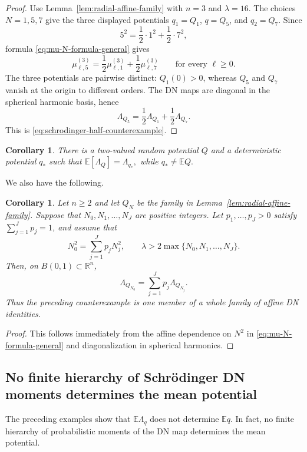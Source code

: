 \documentclass[11pt]{article}
\newcommand{\R}{\mathbb R}
\newcommand{\E}{\mathbb E}
\theoremstyle{plain}
\newtheorem{corollary}[theorem]{Corollary}
\theoremstyle{definition}
\theoremstyle{remark}
\begin{document}
\begin{proof}
Use Lemma~\ref{lem:radial-affine-family} with $n=3$ and $\lambda=16$.  The choices $N=1,5,7$ give the three displayed potentials $q_1=Q_1$, $q=Q_5$, and $q_2=Q_7$.  Since
\[
  5^2=\frac12\cdot1^2+\frac12\cdot7^2,
\]
formula \eqref{eq:mu-N-formula-general} gives
\[
  \mu_{\ell,5}^{(3)}=\frac12\mu_{\ell,1}^{(3)}+\frac12\mu_{\ell,7}^{(3)}
  \qquad\text{for every }\ell\ge0.
\]
The three potentials are pairwise distinct: $Q_1(0)>0$, whereas $Q_5$ and $Q_7$ vanish at the origin to different orders.  The DN maps are diagonal in the spherical harmonic basis, hence
\[
  \Lambda_{Q_5}=\frac12\Lambda_{Q_1}+\frac12\Lambda_{Q_7}.
\]
This is \eqref{eq:schrodinger-half-counterexample}.
\end{proof}

\begin{corollary}\label{cor:random-potential-mean-DN-deterministic}
There is a two-valued random potential $Q$ and a deterministic potential $q_*$ such that
$
  \E[\Lambda_Q]=\Lambda_{q_*},
$
while
$
  q_*\ne \E Q.
$
\end{corollary}

We also have the following.

\begin{corollary}\label{cor:barycentric-DN-identities}
Let $n\ge2$ and let $Q_N$ be the family in Lemma~\ref{lem:radial-affine-family}.  Suppose that $N_0,N_1,\dots,N_J$ are positive integers.  Let $p_1,\dots,p_J>0$ satisfy $\sum_{j=1}^Jp_j=1$, and assume that
\[
  N_0^2=\sum_{j=1}^Jp_jN_j^2,
  \qquad
  \lambda>2\max\{N_0,N_1,\dots,N_J\}.
\]
Then, on $B(0,1)\subset\R^n$,
\[
  \Lambda_{Q_{N_0}}=\sum_{j=1}^Jp_j\Lambda_{Q_{N_j}}.
\]
Thus the preceding counterexample is one member of a whole family of affine DN identities.
\end{corollary}

\begin{proof}
This follows immediately from the affine dependence on $N^2$ in \eqref{eq:mu-N-formula-general} and diagonalization in spherical harmonics.
\end{proof}

\subsection{No finite hierarchy of Schr\"odinger DN moments determines the mean potential}
\label{sec:finite-DN-moments}

The preceding examples show that $\E\Lambda_q$ does not determine $\E q$.  In fact, no finite hierarchy of probabilistic moments of the DN map determines the mean potential.
\end{document}
